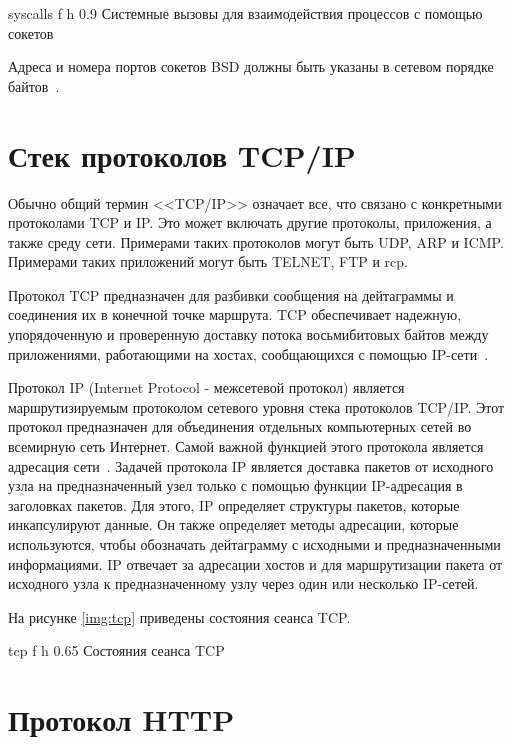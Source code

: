     {syscalls}
    {f}
    {h}
    {0.9\linewidth}
    {Системные вызовы для взаимодействия процессов с помощью сокетов}

Адреса и номера портов сокетов BSD должны быть указаны в сетевом порядке байтов~\cite{stivens}. 

\clearpage

\section{Стек протоколов TCP/IP}

Обычно общий термин <<TCP/IP>> означает все, что связано с конкретными протоколами TCP и IP. Это может включать другие протоколы, приложения, а также среду сети. Примерами таких протоколов могут быть UDP, ARP и ICMP. Примерами таких приложений могут быть TELNET, FTP и rcp.

Протокол TCP предназначен для разбивки сообщения на дейтаграммы и соединения их в конечной точке маршрута. TCP обеспечивает надежную, упорядоченную и проверенную доставку потока восьмибитовых байтов между приложениями, работающими на хостах, сообщающихся с помощью IP-сети~\cite{hunt2002tcp}. 

Протокол IP (Internet Protocol - межсетевой протокол) является маршрутизируемым протоколом сетевого уровня стека протоколов TCP/IP. Этот протокол предназначен для объединения отдельных компьютерных сетей во всемирную сеть Интернет. Самой важной функцией этого протокола является адресация сети~\cite{hunt2002tcp}. Задачей протокола IP является доставка пакетов от исходного узла на предназначенный узел только с помощью функции IP-адресация в заголовках пакетов. Для этого, IP определяет структуры пакетов, которые инкапсулируют данные. Он также определяет методы адресации, которые используются, чтобы обозначать дейтаграмму с исходными и предназначенными
информациями. IP отвечает за адресации хостов и для маршрутизации пакета от исходного узла к предназначенному узлу через один или несколько IP-сетей.

\clearpage

На рисунке \ref{img:tcp} приведены состояния сеанса TCP.

    {tcp}
    {f}
    {h}
    {0.65\linewidth}
    {Состояния сеанса TCP}

\section{Протокол HTTP}

